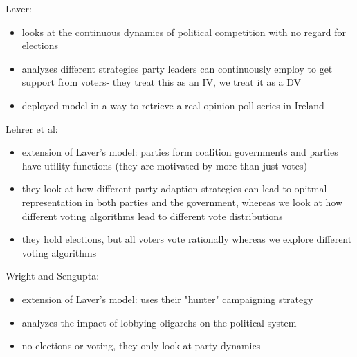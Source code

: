Laver:
\begin{itemize}
\item looks at the continuous dynamics of political competition with no regard for elections
\item analyzes different strategies party leaders can continuously employ to get support from voters- they treat this as an IV, we treat it as a DV
\item deployed model in a way to retrieve a real opinion poll series in Ireland
\end{itemize}
Lehrer et al:
\begin{itemize}
\item extension of Laver's model: parties form coalition governments and parties have utility functions (they are motivated by more than just votes)
\item they look at how different party adaption strategies can lead to opitmal representation in both parties and the government, whereas we look at how different voting algorithms lead to different vote distributions
\item they hold elections, but all voters vote rationally whereas we explore different voting algorithms
\end{itemize}
Wright and Sengupta:
\begin{itemize}
\item extension of Laver's model: uses their "hunter" campaigning  strategy
\item analyzes the impact of lobbying oligarchs on the political system
\item no elections or voting, they only look at party dynamics
\end{itemize}
